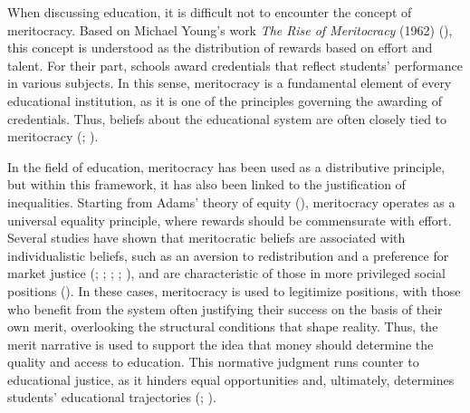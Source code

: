 \documentclass[
  spanish,
  a4paper,
  oneside]{scrbook}
\begin{document}
When discussing education, it is difficult not to encounter the concept
of meritocracy. Based on Michael Young's work \emph{The Rise of
Meritocracy} (1962) (), this concept
is understood as the distribution of rewards based on effort and talent.
For their part, schools award credentials that reflect students'
performance in various subjects. In this sense, meritocracy is a
fundamental element of every educational institution, as it is one of
the principles governing the awarding of credentials. Thus, beliefs
about the educational system are often closely tied to meritocracy
(;
).

In the field of education, meritocracy has been used as a distributive
principle, but within this framework, it has also been linked to the
justification of inequalities. Starting from Adams' theory of equity
(), meritocracy operates as
a universal equality principle, where rewards should be commensurate
with effort. Several studies have shown that meritocratic beliefs are
associated with individualistic beliefs, such as an aversion to
redistribution and a preference for market justice
(;
;
;
;
), and are characteristic
of those in more privileged social positions
(). In these
cases, meritocracy is used to legitimize positions, with those who
benefit from the system often justifying their success on the basis of
their own merit, overlooking the structural conditions that shape
reality. Thus, the merit narrative is used to support the idea that
money should determine the quality and access to education. This
normative judgment runs counter to educational justice, as it hinders
equal opportunities and, ultimately, determines students' educational
trajectories (;
).
\end{document}
